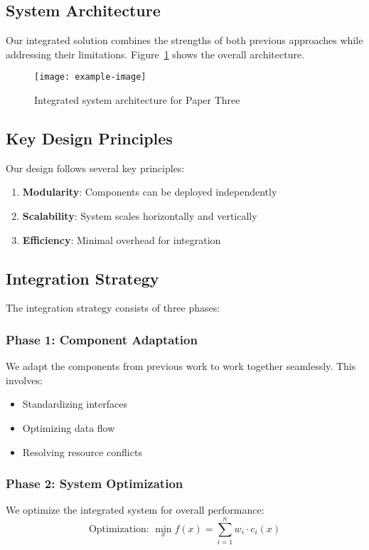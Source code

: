 \subsection{System Architecture}

Our integrated solution combines the strengths of both previous approaches while addressing their limitations. Figure~\ref{fig:paperthree-architecture} shows the overall architecture.

\begin{figure}[!htb]
    \centering
    \texttt{[image: example-image]}
    \caption{Integrated system architecture for Paper Three}
    \label{fig:paperthree-architecture}
\end{figure}

\subsection{Key Design Principles}

Our design follows several key principles:
\begin{enumerate}
    \item \textbf{Modularity}: Components can be deployed independently
    \item \textbf{Scalability}: System scales horizontally and vertically
    \item \textbf{Efficiency}: Minimal overhead for integration
\end{enumerate}

\subsection{Integration Strategy}

The integration strategy consists of three phases:

\subsubsection{Phase 1: Component Adaptation}
We adapt the components from previous work to work together seamlessly. This involves:
\begin{itemize}
    \item Standardizing interfaces
    \item Optimizing data flow
    \item Resolving resource conflicts
\end{itemize}

\subsubsection{Phase 2: System Optimization}
We optimize the integrated system for overall performance:
\begin{equation}
\text{Optimization: } \min_{x} f(x) = \sum_{i=1}^{n} w_i \cdot c_i(x)
\label{eq:system-optimization}
\end{equation}

